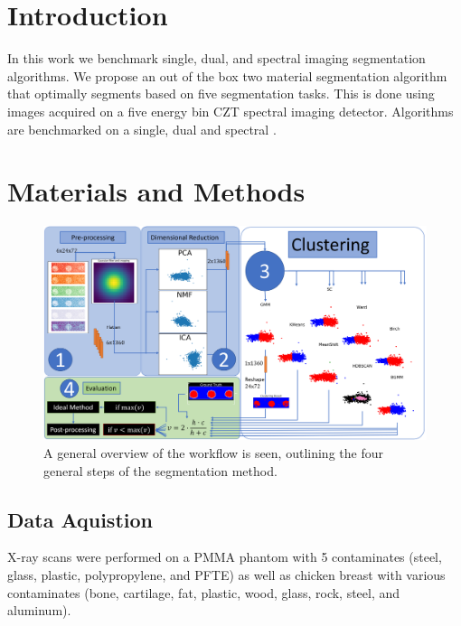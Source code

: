 \documentclass[a4paper,11pt]{article}
\begin{document}
\section{Introduction}




In this work we benchmark single, dual, and spectral imaging segmentation algorithms. We propose an out of the box two material segmentation algorithm that optimally segments based on five segmentation tasks. This is done using images acquired on a five energy bin CZT spectral imaging detector. Algorithms are benchmarked on a single, dual and spectral .






\section{Materials and Methods}
\label{sec:methods}

\begin{figure}[htbp]

\includegraphics[width=\textwidth]{figures/flow_chart.png}

\caption{A general overview of the workflow is seen, outlining the four general steps of the segmentation method.}
\label{overview}
\end{figure}

\subsection{Data Aquistion}
X-ray scans were performed on a PMMA phantom with 5 contaminates (steel, glass, plastic, polypropylene, and PFTE) as well as chicken breast with various contaminates (bone, cartilage, fat, plastic, wood, glass, rock, steel, and aluminum).
\end{document}
